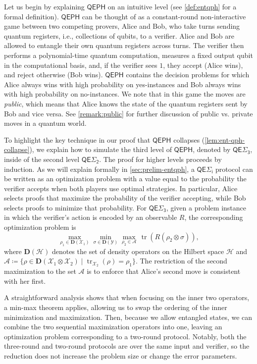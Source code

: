 \documentclass[10pt,a4paper]{article}
\theoremstyle{definition}
\DeclareMathOperator{\tr}{tr}
\newcommand{\class}[1]{\ensuremath{\mathsf{#1}}\xspace}
\newcommand{\QEPH}{\class{QEPH}}
\newcommand{\entQSigmai}[1][i]{\class{QE\Sigma_{#1}}}
\newcommand{\calA}{\mathcal{A}}
\newcommand{\calH}{\mathcal{H}}
\newcommand{\calX}{\mathcal{X}}
\newcommand{\calY}{\mathcal{Y}}
\begin{document}
Let us begin by explaining $\QEPH$ on an intuitive level (see \cref{def:entqph} for a formal definition). 
$\QEPH$ can be thought of as a constant-round non-interactive game between two competing provers, Alice and Bob, who take turns sending quantum registers, i.e., collections of qubits, to a verifier. Alice and Bob are allowed to entangle their own quantum registers across turns.
The verifier then performs a polynomial-time quantum computation, measures a fixed output qubit in the computational basis, and, if the verifier sees $1$, they accept (Alice wins), and reject otherwise (Bob wins). 
$\QEPH$ contains the decision problems for which Alice always wins with high probability on yes-instances and Bob always wins with high probability on no-instances. 
We note that in this game the moves are \emph{public}, which means that Alice knows the state of the quantum registers sent by Bob and vice versa.
See \cref{remark:public} for further discussion of public vs. private moves in a quantum world.


To highlight the key technique in our proof that $\QEPH$ collapses (\cref{lem:ent-qph-collapse}), we explain how to simulate the third level of $\QEPH$, denoted by $\entQSigmai[3]$, inside of the second level $\entQSigmai[2]$. The proof for higher levels proceeds by induction.
As we will explain formally in \cref{sec:prelim-entqph}, a $\entQSigmai[i]$ protocol can be written as an optimization problem with a value equal to the probability the verifier accepts when both players use optimal strategies.
In particular, Alice selects proofs that maximize the probability of the verifier accepting, while Bob selects proofs to minimize that probability.
For $\entQSigmai[3]$, given a problem instance in which the verifier's action is encoded by an observable $R$, the corresponding optimization problem is
\begin{equation*}
    \max_{\rho_1 \in \mathbf{D}(\calX_1)} \min_{\sigma \in \mathbf{D}(\calY)} \max_{\rho_2 \in \calA}\, \tr\left( R \left( \rho_2 \otimes \sigma\right) \right),  
\end{equation*}
where $\mathbf{D}(\calH)$ denotes the set of density operators on the Hilbert space $\calH$
and $\calA \coloneqq \{ \rho \in \mathbf{D}(\calX_1 \otimes \calX_2) \mid \tr_{\calX_2}(\rho) = \rho_1\}$.
The restriction of the second maximization to the set $\calA$ is 
to enforce that Alice's second move is consistent with her first.

A straightforward analysis shows that when focusing on the inner two operators, a min-max theorem applies, allowing us to swap the ordering of the inner minimization and maximization. Then, because we allow entangled states, we can combine the two sequential maximization operators into one, leaving an optimization problem corresponding to a two-round protocol.
Notably, both the three-round and two-round protocols are over the same input and verifier, so the reduction does not increase the problem size or change the error parameters.
\end{document}

